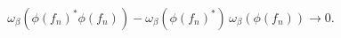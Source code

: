 \begin{equation} \label{central}
\omega_\beta (\phi(f_n)^*\phi(f_n) )
- \omega_\beta (\phi(f_n)^*) \, \omega_\beta (\phi(f_n)) \rightarrow 0.
\end{equation}

